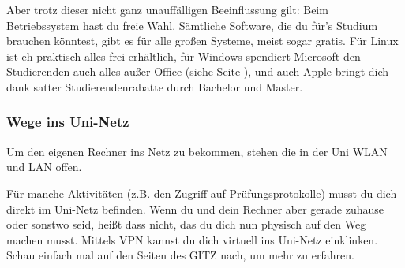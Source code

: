 			Aber trotz dieser nicht ganz unauffälligen Beeinflussung gilt: Beim Betriebssystem hast du freie Wahl. Sämtliche Software, die du für's Studium brauchen  könntest, gibt es für alle großen Systeme, meist sogar gratis. Für Linux ist eh  praktisch alles frei erhältlich, für Windows spendiert Microsoft den Studierenden auch alles außer Office (siehe Seite \pageref{msdnaa}), und auch Apple bringt dich dank satter Studierendenrabatte durch Bachelor und Master. 

		\subsubsection{Wege ins Uni-Netz}
			Um den eigenen Rechner ins Netz zu bekommen, stehen die in der Uni WLAN und LAN offen.

			Für manche Aktivitäten (z.B. den Zugriff auf Prüfungsprotokolle) musst du dich direkt im Uni-Netz befinden. Wenn du und dein Rechner aber gerade zuhause oder sonstwo seid, heißt dass nicht, das du dich nun physisch auf den Weg machen musst. Mittels VPN kannst du dich virtuell ins Uni-Netz einklinken. Schau einfach mal auf den Seiten des GITZ nach, um mehr zu erfahren.
